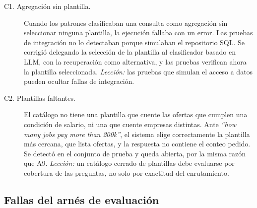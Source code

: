\begin{description}
    \item[C1. Agregación sin plantilla.] Cuando los patrones clasificaban una consulta como agregación sin seleccionar ninguna plantilla, la ejecución fallaba con un error. Las pruebas de integración no lo detectaban porque simulaban el repositorio SQL. Se corrigió delegando la selección de la plantilla al clasificador basado en LLM, con la recuperación como alternativa, y las pruebas verifican ahora la plantilla seleccionada. \emph{Lección:} las pruebas que simulan el acceso a datos pueden ocultar fallas de integración.
    \item[C2. Plantillas faltantes.] El catálogo no tiene una plantilla que cuente las ofertas que cumplen una condición de salario, ni una que cuente empresas distintas. Ante \textit{\enquote{how many jobs pay more than 200k}}, el sistema elige correctamente la plantilla más cercana, que lista ofertas, y la respuesta no contiene el conteo pedido. Se detectó en el conjunto de prueba y queda abierta, por la misma razón que A9. \emph{Lección:} un catálogo cerrado de plantillas debe evaluarse por cobertura de las preguntas, no solo por exactitud del enrutamiento.
\end{description}

\subsection{Fallas del arnés de evaluación}

